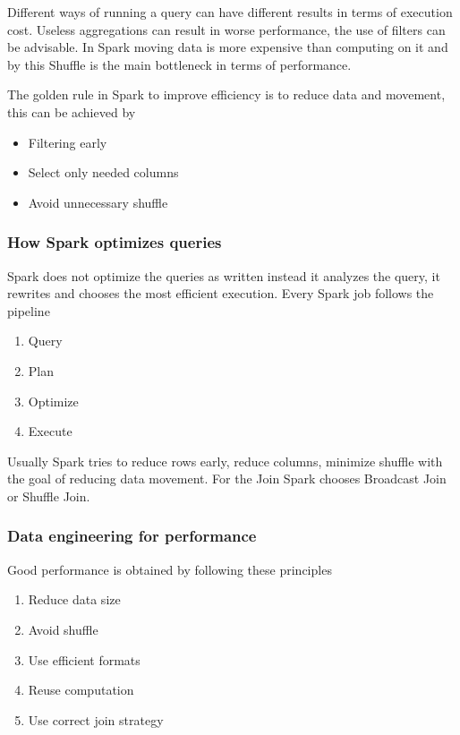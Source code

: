 Different ways of running a query can have different results in terms of execution cost. Useless aggregations can result in worse performance, the use of filters can be advisable. In Spark moving data is more expensive than computing on it and by this Shuffle is the main bottleneck in terms of performance.

\vspace{10pt}

The golden rule in Spark to improve efficiency is to reduce data and movement, this can be achieved by

\begin{itemize}
    \item Filtering early
    \item Select only needed columns
    \item Avoid unnecessary shuffle
\end{itemize}


\subsubsection{How Spark optimizes queries}

Spark does not optimize the queries as written instead it analyzes the query, it rewrites and chooses the most efficient execution. Every Spark job follows the pipeline

\begin{enumerate}
    \item Query
    \item Plan
    \item Optimize
    \item Execute
\end{enumerate}

Usually Spark tries to reduce rows early, reduce columns, minimize shuffle with the goal of reducing data movement. For the Join Spark chooses Broadcast Join or Shuffle Join.



\subsubsection{Data engineering for performance}

Good performance is obtained by following these principles

\begin{enumerate}
    \item Reduce data size
    \item Avoid shuffle
    \item Use efficient formats
    \item Reuse computation
    \item Use correct join strategy
\end{enumerate}

